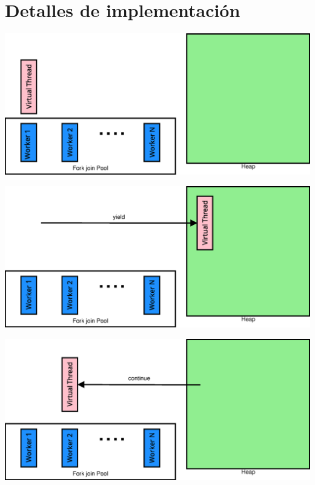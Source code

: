 \documentclass{presentacion}
\begin{document}
\section{Detalles de implementación}
\begin{frame}
    \begin{center}
        \includegraphics[width=.8\textwidth]{img/implementacion1}
    \end{center}
\end{frame}
\begin{frame}
    \begin{center}
        \includegraphics[width=.8\textwidth]{img/implementacion2}
    \end{center}
\end{frame}
\begin{frame}
    \begin{center}
        \includegraphics[width=.8\textwidth]{img/implementacion3}
    \end{center}
\end{frame}
\end{document}
